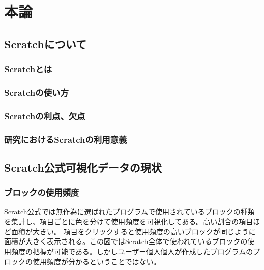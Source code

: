 \documentclass[a4paper,10pt,onecolumn,oneside,openany]{jsbook}
\begin{document}


\part{本論}

\chapter{Scratchについて}
\section{Scratchとは}
\section{Scratchの使い方}
\section{Scratchの利点、欠点}
\section{研究におけるScratchの利用意義}

\chapter{Scratch公式可視化データの現状}
\section{ブロックの使用頻度}

Scratch公式では無作為に選ばれたプログラムで使用されているブロックの種類を集計し、項目ごとに色を分けて使用頻度を可視化してある。高い割合の項目ほど面積が大きい。
 項目をクリックすると使用頻度の高いブロックが同じように面積が大きく表示される。この図ではScratch全体で使われているブロックの使用頻度の把握が可能である。しかしユーザー個人個人が作成したプログラムのブロックの使用頻度が分かるということではない。
 
\end{document}
